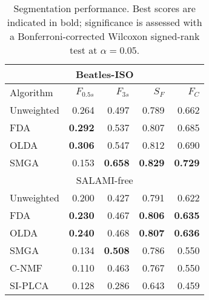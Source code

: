 \begin{table}
\centering
\caption{Segmentation performance. Best scores are indicated in bold; significance is assessed with a Bonferroni-corrected Wilcoxon
signed-rank test at $\alpha=0.05$.\label{tab:results}}
\begin{tabular}{lrrrr}
\multicolumn{5}{c}{Beatles-ISO}\\
\toprule%
Algorithm   & $F_{0.5s}$ & $F_{3s}$   & $S_F$ & $F_C$\\
\hline
Unweighted  & 0.264             & 0.497             & 0.789             & 0.662\\
FDA         & \textbf{0.292}    & 0.537             & 0.807             & 0.685\\
OLDA        & \textbf{0.306}    & 0.547             & 0.812             & 0.690\\
\hline
SMGA~\hfill\cite{serra2012unsupervised} 
            & 0.153             & \textbf{0.658}    & \textbf{0.829}    & \textbf{0.729}\\
\toprule%
\multicolumn{5}{c}{SALAMI-free}\\
\toprule%
Unweighted  & 0.200             & 0.427             & 0.791             & 0.622\\
FDA         & \textbf{0.230}    & 0.467             & \textbf{0.806}    & \textbf{0.635}\\
OLDA        & \textbf{0.240}    & 0.468             & \textbf{0.807}    & \textbf{0.636}\\
\hline
SMGA~\hfill\cite{serra2012unsupervised} 
            & 0.134             & \textbf{0.508}    & 0.786             & 0.550\\
C-NMF~\hfill\cite{nieto2013convex}  
            & 0.110             & 0.463             & 0.767             & 0.550\\
SI-PLCA~\hfill\cite{weiss2011unsupervised}  
            & 0.128             & 0.286             & 0.643             & 0.459\\
\bottomrule%
\end{tabular}
\end{table}
